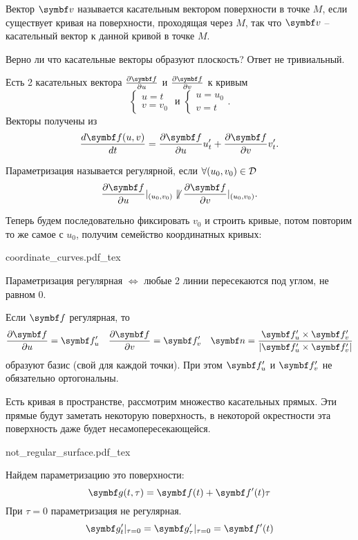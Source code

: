 \documentclass[main]{subfiles}
\begin{document}
\begin{definition}
    Вектор $\vv$ называется касательным вектором поверхности в точке $M$,
    если существует кривая на поверхности, проходящая через $M$, так что
    $\vv$ -- касательный вектор к данной кривой в точке $M$.
\end{definition}

Верно ли что касательные векторы образуют плоскость? Ответ не тривиальный.

Есть 2 касательных вектора
$\frac{\partial \vf}{\partial u}$ и $\frac{\partial \vf}{\partial v}$ к кривым
\[\begin{cases}
        u = t \\
        v = v_0
    \end{cases}
    \text{ и }
    \begin{cases}
        u = u_0 \\
        v = t
    \end{cases}.\]
Векторы получены из
\[\frac{d\vf(u,v)}{dt} = \frac{\partial\vf}{\partial u} u_t' + \frac{\partial\vf}{\partial v} v_t'.\]

\begin{definition}
    Параметризация называется регулярной, если $\forall (u_0, v_0) \in \mathcal{D}$
    \[\frac{\partial\vf}{\partial u}|_{(u_0, v_0)}
        \not\parallel
        \frac{\partial\vf}{\partial v}|_{(u_0, v_0)}.\]
\end{definition}
Теперь будем последовательно фиксировать $v_0$ и строить кривые,
потом повторим то же самое с $u_0$, получим семейство координатных кривых:
\begin{center}
    {coordinate_curves.pdf_tex}
\end{center}
Параметризация регулярная $\Leftrightarrow$ любые 2 линии пересекаются под углом, не равном 0.

Если $\vf$ регулярная, то
\[
    \frac{\partial \vf}{\partial u} = \vf'_u \quad
    \frac{\partial \vf}{\partial v} = \vf'_v \quad
    \vn = \frac{\vf_u' \times \vf_v'}{|\vf_u' \times \vf_v'|}
\]
образуют базис (свой для каждой точки).
При этом $\vf_u'$ и $\vf_v'$ не обязательно ортогональны.

\begin{example}
    Есть кривая в пространстве, рассмотрим множество касательных прямых.
    Эти прямые будут заметать некоторую поверхность, в некоторой окрестности эта поверхность даже будет несамопересекающейся.
    \begin{center}
        {not_regular_surface.pdf_tex}
    \end{center}
    Найдем параметризацию это поверхности:
    \[\vg(t, \tau) = \vf(t) + \vf'(t) \tau\]
    При $\tau = 0$ параметризация не регулярная.
    \[\vg_t' |_{\tau = 0} = \vg_\tau'|_{\tau =0} = \vf'(t)\]
\end{example}
\end{document}
